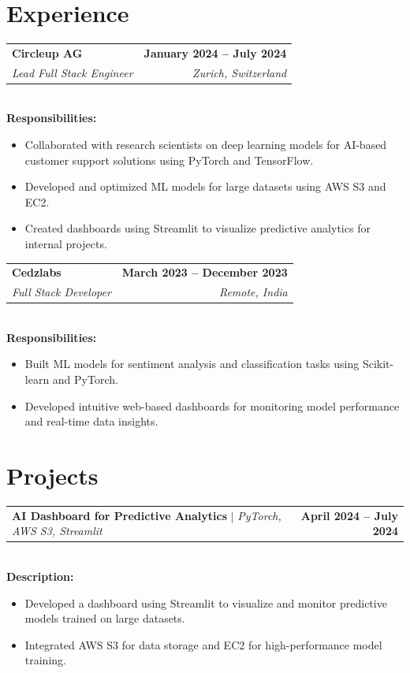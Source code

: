 \documentclass[letterpaper,11pt]{article}
\makeatletter
\newcommand{\resumeSubheading}[4]{
  \vspace{-2pt}\item
    \begin{tabular*}{1.0\textwidth}[t]{l@{\extracolsep{\fill}}r}
      \textbf{#1} & \textbf{\small #2} \\
      \textit{\small#3} & \textit{\small #4} \\
    \end{tabular*}\vspace{-7pt}
}
\newcommand{\resumeProjectHeading}[2]{
    \item
    \begin{tabular*}{1.001\textwidth}{l@{\extracolsep{\fill}}r}
      \small#1 & \textbf{\small #2}\\
    \end{tabular*}\vspace{-7pt}
}
\makeatother
\begin{document}
\section{Experience}

\resumeSubheading
{Circleup AG}{January 2024 -- July 2024}
{Lead Full Stack Engineer}{Zurich, Switzerland}\\
\vspace{10pt}
\textbf{Responsibilities:}
\begin{itemize}[leftmargin=0.15in, label={}]
\item Collaborated with research scientists on deep learning models for AI-based customer support solutions using PyTorch and TensorFlow.
\item Developed and optimized ML models for large datasets using AWS S3 and EC2.
\item Created dashboards using Streamlit to visualize predictive analytics for internal projects.
\end{itemize}

\resumeSubheading
{Cedzlabs}{March 2023 -- December 2023}
{Full Stack Developer}{Remote, India}\\
\vspace{10pt}
\textbf{Responsibilities:}
\begin{itemize}[leftmargin=0.15in, label={}]
\item Built ML models for sentiment analysis and classification tasks using Scikit-learn and PyTorch.
\item Developed intuitive web-based dashboards for monitoring model performance and real-time data insights.
\end{itemize}

\section{Projects}

\resumeProjectHeading
{\textbf{AI Dashboard for Predictive Analytics} $|$ \emph{PyTorch, AWS S3, Streamlit}}{April 2024 -- July 2024}\\
\vspace{6pt}
\textbf{Description:}
\begin{itemize}[leftmargin=0.15in, label={}]
\item Developed a dashboard using Streamlit to visualize and monitor predictive models trained on large datasets.
\item Integrated AWS S3 for data storage and EC2 for high-performance model training.
\end{itemize}
\end{document}
